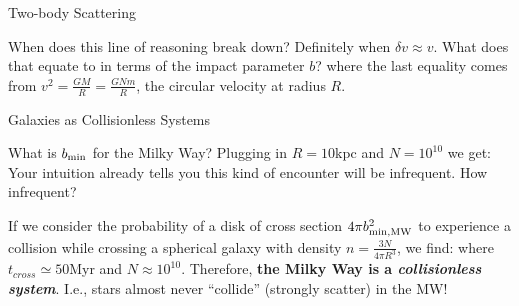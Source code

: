 \documentclass[letterpaper,landscape]{slides}
\begin{document}
\begin{slide}
\begin{center}
{\large \color{red} Two-body Scattering }
\end{center}

\begin{center}
\vskip -0.0in
\end{center}

When does this line of reasoning break down? Definitely when $\delta v
\approx v$. What does that equate to in terms of the impact parameter $b$?
where the last equality comes from $v^2 = \frac{G M}{R} = \frac{ G N m}{R}$,
the circular velocity at radius $R$.

\vfill
\end{slide}


\begin{slide}
\begin{center}
{\large \color{red} Galaxies as Collisionless Systems }
\end{center}

What is $b_{\rm min}$ for the Milky Way? Plugging in $R = 10$kpc and $N=10^{10}$
we get:
Your intuition already tells you this kind of encounter will be infrequent.
How infrequent?

If we consider the probability of a disk of cross section
$4 \pi b_{\rm min, MW}^2$ to experience a collision while crossing a spherical
galaxy with density $n = \frac{3 N}{4 \pi R^3}$, we find:
where $t_{cross} \simeq 50$Myr and $N \approx 10^{10}$. Therefore,  {\bf the
Milky Way is a {\em collisionless system}}. I.e., stars almost never
``collide'' (strongly scatter) in the MW!

\vfill
\end{slide}
\end{document}
